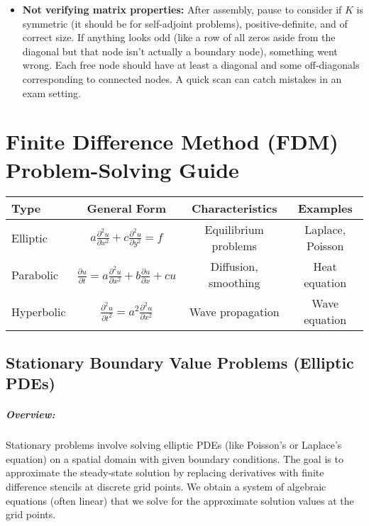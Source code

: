 \documentclass[a4paper,11pt]{report}
\begin{document}
\begin{itemize}
    \item \textbf{Not verifying matrix properties:} After assembly, pause to consider if $K$ is symmetric (it should be for self-adjoint problems), positive-definite, and of correct size. If anything looks odd (like a row of all zeros aside from the diagonal but that node isn't actually a boundary node), something went wrong. Each free node should have at least a diagonal and some off-diagonals corresponding to connected nodes. A quick scan can catch mistakes in an exam setting.
\end{itemize}

\chapter{Finite Difference Method (FDM) Problem-Solving Guide}
\begin{tcolorbox}[colback=mybg, colframe=black, title=PDE Classification Summary]
\begin{center}
\renewcommand{\arraystretch}{1.3}
\begin{tabular}{l|c|c|c}
\toprule
\textbf{Type} & \textbf{General Form} & \textbf{Characteristics} & \textbf{Examples} \\
\midrule
\textcolor{myblue}{Elliptic} & $a\frac{\partial^2 u}{\partial x^2} + c\frac{\partial^2 u}{\partial y^2} = f$ & Equilibrium problems & Laplace, Poisson \\
\textcolor{mygreen}{Parabolic} & $\frac{\partial u}{\partial t} = a\frac{\partial^2 u}{\partial x^2} + b\frac{\partial u}{\partial x} + cu$ & Diffusion, smoothing & Heat equation \\
\textcolor{myred}{Hyperbolic} & $\frac{\partial^2 u}{\partial t^2} = a^2\frac{\partial^2 u}{\partial x^2}$ & Wave propagation & Wave equation \\
\bottomrule
\end{tabular}
\end{center}
\end{tcolorbox}
\section{Stationary Boundary Value Problems (Elliptic PDEs)}
\paragraph{Overview:}
Stationary problems involve solving elliptic PDEs (like Poisson’s or Laplace’s equation) on a spatial domain with given boundary conditions. The goal is to approximate the steady-state solution by replacing derivatives with finite difference stencils at discrete grid points. We obtain a system of algebraic equations (often linear) that we solve for the approximate solution values at the grid points.
\end{document}
